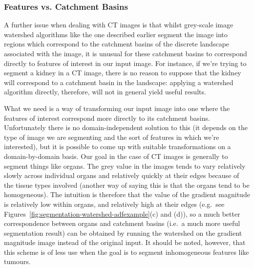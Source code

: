 
\subsubsection{Features vs. Catchment Basins}

A further issue when dealing with CT images is that whilst grey-scale image watershed algorithms like the one described earlier segment the image into regions which correspond to the catchment basins of the discrete landscape associated with the image, it is unusual for these catchment basins to correspond directly to features of interest in our input image. For instance, if we're trying to segment a kidney in a CT image, there is no reason to suppose that the kidney will correspond to a catchment basin in the landscape: applying a watershed algorithm directly, therefore, will not in general yield useful results.

What we need is a way of transforming our input image into one where the features of interest correspond more directly to its catchment basins. Unfortunately there is no domain-independent solution to this (it depends on the type of image we are segmenting and the sort of features in which we're interested), but it is possible to come up with suitable transformations on a domain-by-domain basis. Our goal in the case of CT images is generally to segment things like organs. The grey value in the images tends to vary relatively slowly across individual organs and relatively quickly at their edges because of the tissue types involved (another way of saying this is that the organs tend to be homogeneous). The intuition is therefore that the value of the gradient magnitude is relatively low within organs, and relatively high at their edges (e.g.~see Figures~\ref{fig:segmentation-watershed-adfexample}(c) and (d)), so a much better correspondence between organs and catchment basins (i.e.~a much more useful segmentation result) can be obtained by running the watershed on the gradient magnitude image instead of the original input. It should be noted, however, that this scheme is of less use when the goal is to segment inhomogeneous features like tumours.


